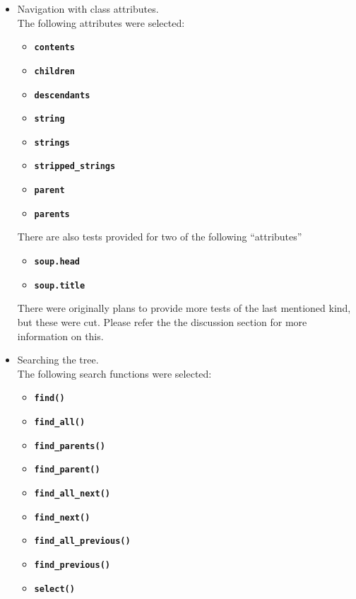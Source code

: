 \documentclass[10pt]{article}
\newcommand{\tbt}[1]{\texttt{\textbf{#1}}}
\begin{document}
\begin{itemize}
  \item Navigation with class attributes. \\
  The following attributes were selected: 
  \begin{itemize}
   \setlength\itemsep{-0.05em}
   \item \tbt{contents}
   \item \tbt{children}
   \item \tbt{descendants} 
   \item \tbt{string}
   \item \tbt{strings}
   \item \tbt{stripped\_strings}
   \item \tbt{parent}
   \item \tbt{parents}
  \end{itemize} 
  There are also tests provided for two of the following ``attributes''
  \begin{itemize}
  \setlength\itemsep{-0.05em}
   \item \tbt{soup.head}
   \item \tbt{soup.title} 
  \end{itemize}
  There were originally plans to provide more tests of the last mentioned kind, but these were cut. Please refer the the discussion section for more information on this.

  \item Searching the tree. \\
  The following search functions were selected: 
  \begin{itemize}
  \setlength\itemsep{-0.05em}
    \item \tbt{find()}
    \item \tbt{find\_all()}
    \item \tbt{find\_parents()}
    \item \tbt{find\_parent()}
    \item \tbt{find\_all\_next()}
    \item \tbt{find\_next()}
    \item \tbt{find\_all\_previous()}
    \item \tbt{find\_previous()}
    \item \tbt{select()}
  \end{itemize}


\end{itemize}
\end{document}
